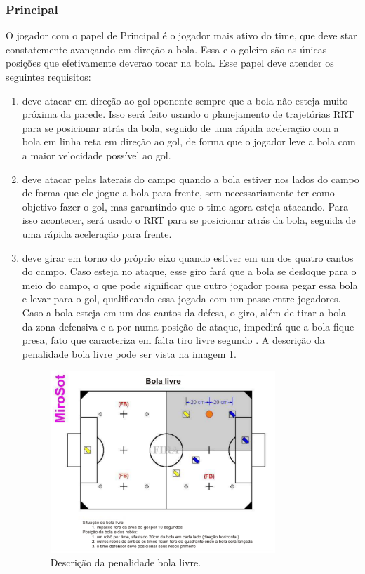 \documentclass[a4paper,12pt]{article}
\begin{document}
\subsubsection{Principal} 

O jogador com o papel de Principal é o jogador mais ativo do time, que deve star constatemente avançando em direção a bola. Essa e o goleiro são as únicas posições que efetivamente deverao tocar na bola. Esse papel deve atender os seguintes requisitos:

\begin{enumerate}
\item deve atacar em direção ao gol oponente sempre que a bola não esteja muito próxima da parede. Isso será feito usando o planejamento de trajetórias RRT para se posicionar atrás da bola, seguido de uma rápida aceleração com a bola em linha reta em direção ao gol, de forma que o jogador leve a bola com a maior velocidade possível ao gol.
\item deve atacar pelas laterais do campo quando a bola estiver nos lados do campo de forma que ele jogue a bola para frente, sem necessariamente ter como objetivo fazer o gol, mas garantindo que o time agora esteja atacando. Para isso acontecer, será usado o RRT para se posicionar atrás da bola, seguida de uma rápida aceleração para frente.
\item deve girar em torno do próprio eixo quando estiver em um dos quatro cantos do campo. Caso esteja no ataque, esse giro fará que a bola se desloque para o meio do campo, o que pode significar que outro jogador possa pegar essa bola e levar para o gol, qualificando essa jogada com um passe entre jogadores. Caso a bola esteja em um dos cantos da defesa, o giro, além de tirar a bola da zona defensiva e a por numa posição de ataque, impedirá que a bola fique presa, fato que caracteriza em falta tiro livre segundo \cite{cbr2008}. A descrição da penalidade bola livre pode ser vista na imagem \ref{fig:bola_livre}.


\begin{figure}[H]
	\centering
	\includegraphics[width=0.8\textwidth]{figures/bola_livre.png}
   \caption{Descrição da penalidade bola livre.} \label{fig:bola_livre}
\end{figure}


\end{enumerate}
\end{document}

